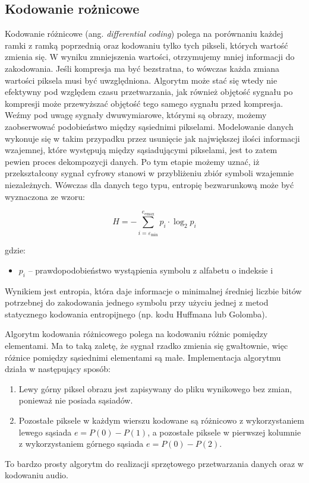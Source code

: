 \documentclass{article}
\begin{document}
\subsection{Kodowanie rożnicowe}
\label{sec:roznicowe}

Kodowanie różnicowe (ang. \emph{differential coding}) polega na porównaniu każdej ramki z ramką
poprzednią oraz kodowaniu tylko tych pikseli, których wartość zmienia się. W wyniku
zmniejszenia wartości, otrzymujemy mniej informacji do zakodowania. Jeśli kompresja ma
być bezstratna, to wówczas każda zmiana wartości piksela musi być uwzględniona. Algorytm może stać się wtedy nie efektywny pod względem czasu przetwarzania, jak również objętość sygnału po kompresji może przewyższać objętość tego samego sygnału przed kompresja.  Weźmy pod uwagę sygnały dwuwymiarowe, którymi są obrazy, możemy zaobserwować podobieństwo między sąsiednimi pikselami. Modelowanie danych wykonuje się w takim przypadku przez usunięcie jak największej ilości informacji wzajemnej, które występują między sąsiadującymi pikselami, jest to zatem pewien proces dekompozycji danych. Po tym etapie możemy uznać, iż przekształcony sygnał cyfrowy stanowi w przybliżeniu zbiór symboli wzajemnie niezależnych. Wówczas dla danych tego typu, entropię bezwarunkową może być wyznaczona ze wzoru:

\begin{equation}
    \label{eq:entropia}
    H = -\sum_{i=\varepsilon_{\textrm{min}}}^{e_{\textrm{emax}}} p_{i} \cdot \log_{2} p_{i}
\end{equation}

gdzie:
\begin{itemize}[label=]
 \item $p_i$ -- prawdopodobieństwo wystąpienia symbolu z alfabetu o indeksie i
\end{itemize}

Wynikiem jest entropia, która daje informacje o minimalnej średniej liczbie bitów potrzebnej do zakodowania jednego symbolu przy użyciu jednej z metod statycznego kodowania entropijnego (np. kodu Huffmana lub Golomba).

Algorytm kodowania różnicowego polega na kodowaniu różnic pomiędzy elementami. Ma to taką zaletę, że sygnał rzadko zmienia się gwałtownie, więc różnice pomiędzy sąsiednimi elementami są małe. Implementacja algorytmu działa w następujący sposób:

\begin{enumerate}
 \item Lewy górny piksel obrazu jest zapisywany do pliku wynikowego bez zmian, ponieważ nie posiada sąsiadów.
 \item Pozostałe piksele w każdym wierszu kodowane są różnicowo z wykorzystaniem lewego sąsiada $e = P(0) - P(1)$, a pozostałe piksele w pierwszej kolumnie z wykorzystaniem górnego sąsiada $e = P(0) - P(2)$.
\end{enumerate}
To bardzo prosty algorytm do realizacji sprzętowego przetwarzania danych oraz w kodowaniu audio.
\end{document}
